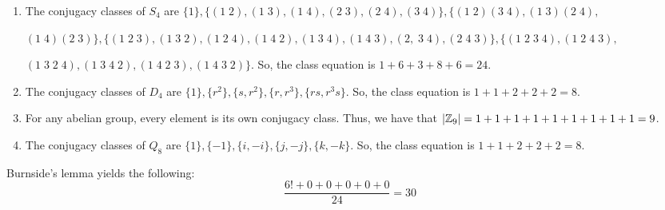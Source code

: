\documentclass[12pt]{report}
\begin{document}
\sol
\begin{enumerate}[label=\alph*.]
    \item The conjugacy classes of $S_4$ are $\{1\}, \{(1\;2), (1\;3), (1\;4), (2\;3), (2\;4), (3\;4)\}, \{(1\;2)(3\;4), (1\;3)(2\;4),$ 
    
    $(1\;4)(2\;3)\}, \{(1\;2\;3), (1\;3\;2), (1\;2\;4), (1\;4\;2), (1\;3\;4), (1\;4\;3), (2, \;3 \; 4), (2\;4\;3)\}, \{(1\;2\;3\;4), (1\;2\;4\;3),$
    
    $(1\;3\;2\;4), (1\;3\;4\;2), (1\;4\;2\;3), (1\;4\;3\;2)\}$. So, the class equation is $1 + 6 + 3 + 8 + 6 = 24$.
    \item The conjugacy classes of $D_4$ are $\{1\}, \{r^2\}, \{s, r^2\}, \{r, r^3\}, \{rs, r^3s\}$. So, the class equation is $1 + 1 + 2 + 2 + 2 = 8$.
    \item For any abelian group, every element is its own conjugacy class. Thus, we have that $|\ZZ_9| = 1 + 1 + 1 + 1 + 1 + 1 + 1 + 1 + 1 = 9$.
    \item The conjugacy classes of $Q_8$ are $\{1\}, \{-1\}, \{i, -i\}, \{j, -j\}, \{k, -k\}$. So, the class equation is $1 + 1 + 2 + 2 + 2 = 8$. 
\end{enumerate}

\sol Burnside's lemma yields the following:
$$\frac{6! + 0 + 0 + 0 + 0 + 0}{24} = \boxed{30}$$
\end{document}
